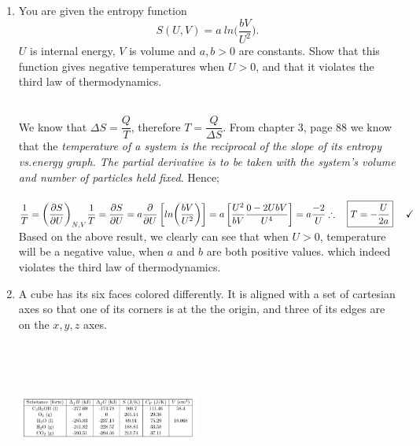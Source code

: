 \documentclass[fleqn]{article}
\begin{document}
\begin{enumerate}
\begin{enumerate}
    \end{enumerate}

    \item You are given the entropy function
    $$
      S(U, V)=a ~ ln \bigg( \dfrac{bV}{U^2} \bigg).
    $$
    $U$ is internal energy, $V$ is volume and $a, b > 0$ are constants. Show that this function gives
    negative temperatures when $U > 0$, and that it violates the third law of thermodynamics.

      \textcolor{hwColor}{
        \\
        We know that $\Delta S=\dfrac{Q}{T}$, therefore $T=\dfrac{Q}{\Delta S}$. From chapter 3, page 88 we know that
        the \emph{temperature of a system is the reciprocal of the slope of its entropy vs.energy graph. The partial derivative
        is to be taken with the system's volume and number of particles held fixed}. Hence;
        \\
        \\
        $
          \dfrac{1}{T}=\bigg( \dfrac{\partial S}{\partial U} \bigg)_{N,V}
          \\
          \\
          \\
          \dfrac{1}{T}=\dfrac{\partial S}{\partial U}=a \dfrac{\partial}{\partial U} \left[ ln \bigg( \dfrac{bV}{U^2} \bigg) \right]
          =a \left[
            \dfrac{U^2}{bV} \dfrac{0-2UbV}{U^4}
          \right]
          =a \dfrac{-2}{U}
          \\
          \\
          \\
          \therefore ~~~ \boxed{
            T=-\dfrac{U}{2a}
          } ~~~~ \checkmark
          \\
          \\
          \\
        $
        Based on the above result, we clearly can see that when $U > 0$, temperature will be a negative value, when $a$ and $b$ are
        both positive values. which indeed violates the third law of thermodynamics.
      }

    \pagebreak

    \item A cube has its six faces colored differently. It is aligned with a set of cartesian axes so that
    one of its corners is at the the origin, and three of its edges are on the $x, y, z$ axes.

    \begin{center}
      \includegraphics[height=5cm, width=6cm]{1.JPG}
    \end{center}


\end{enumerate}
\end{document}
